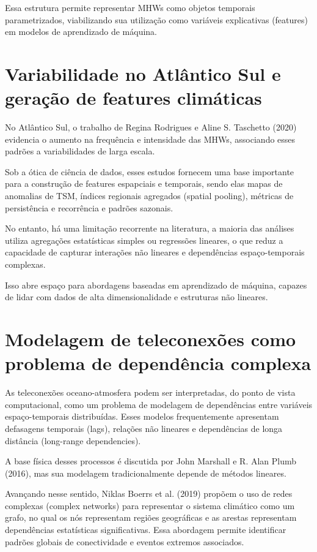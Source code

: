 	Essa estrutura permite representar MHWs como objetos temporais parametrizados, viabilizando sua utilização como variáveis explicativas (features) em modelos de aprendizado de máquina.


\section{Variabilidade no Atlântico Sul e geração de features climáticas}\label{sec:variabildade-features} 
	
	No Atlântico Sul, o trabalho de Regina Rodrigues e Aline S. Taschetto (2020) evidencia o aumento na frequência e intensidade das MHWs, associando esses padrões a variabilidades de larga escala.

	Sob a ótica de ciência de dados, esses estudos fornecem uma base importante para a construção de features espapciais e temporais, sendo elas mapas de anomalias de TSM, índices regionais agregados (spatial pooling), métricas de persistência e recorrência e padrões sazonais.

	No entanto, há uma limitação recorrente na literatura, a maioria das análises utiliza agregações estatísticas simples ou regressões lineares, o que reduz a capacidade de capturar interações não lineares e dependências espaço-temporais complexas.

	Isso abre espaço para abordagens baseadas em aprendizado de máquina, capazes de lidar com dados de alta dimensionalidade e estruturas não lineares. 


\section{Modelagem de teleconexões como problema de dependência complexa}\label{sec:modelagem-teleconexoes}

	As teleconexões oceano-atmosfera podem ser interpretadas, do ponto de vista computacional, como um problema de modelagem de dependências entre variáveis espaço-temporais distribuídas. Esses modelos frequentemente apresentam defasagens temporais (lags), relações não lineares e dependências de longa distância (long-range dependencies).
	
	A base física desses processos é discutida por John Marshall e R. Alan Plumb (2016), mas sua modelagem tradicionalmente depende de métodos lineares.

	Avançando nesse sentido, Niklas Boerrs et al. (2019) propõem o uso de redes complexas (complex networks) para representar o sistema climático como um grafo, no qual os nós representam regiões geográficas e as arestas representam dependências estatísticas significativas. Essa abordagem permite identificar padrões globais de conectividade e eventos extremos associados.

